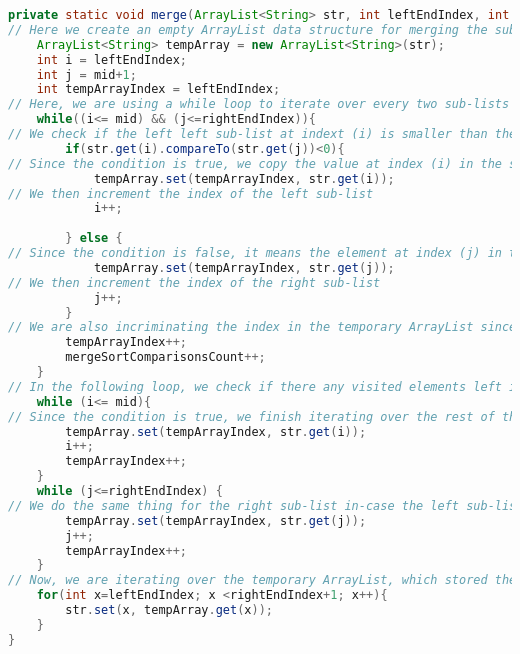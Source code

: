 \documentclass{article}
\begin{document}
\begin{lstlisting}[language=Java]
private static void merge(ArrayList<String> str, int leftEndIndex, int mid, int rightEndIndex) {
// Here we create an empty ArrayList data structure for merging the sub-lists since we can't use our original list to merge the sub-lists because there are more than two sub-lists. We then copy the elements of the original list into the new temporary list because we can't access the indices of an empty list.  
    ArrayList<String> tempArray = new ArrayList<String>(str);
    int i = leftEndIndex;
    int j = mid+1;
    int tempArrayIndex = leftEndIndex;
// Here, we are using a while loop to iterate over every two sub-lists by comparing the their values to each other and placing each value in the sub-list onto the temporary ArrayList we have created for storing sub-lists. 
    while((i<= mid) && (j<=rightEndIndex)){
// We check if the left left sub-list at indext (i) is smaller than the one in the right.
        if(str.get(i).compareTo(str.get(j))<0){
// Since the condition is true, we copy the value at index (i) in the sub-list into the temporary ArrayList of strings. 
            tempArray.set(tempArrayIndex, str.get(i));
// We then increment the index of the left sub-list 
            i++;
            
        } else {
// Since the condition is false, it means the element at index (j) in the right sub-list is smaller and that element will be stored in the temporary ArrayList at index (j)
            tempArray.set(tempArrayIndex, str.get(j));
// We then increment the index of the right sub-list 
            j++;
        }
// We are also incriminating the index in the temporary ArrayList since we place an element at the current index 
        tempArrayIndex++;
        mergeSortComparisonsCount++;
    }
// In the following loop, we check if there any visited elements left in the left sub-list in case the right sub-list traversal finished before the left-sub-list.  
    while (i<= mid){
// Since the condition is true, we finish iterating over the rest of the elements int he left sub-list and just put them in the temproray list since there are no element to compare with fromt he right sub-list. 
        tempArray.set(tempArrayIndex, str.get(i));
        i++;
        tempArrayIndex++;
    }
    while (j<=rightEndIndex) {
// We do the same thing for the right sub-list in-case the left sub-list are visited before the right sub-list iteration is finished and just put them in the temporary list. 
        tempArray.set(tempArrayIndex, str.get(j));
        j++;
        tempArrayIndex++;
    }
// Now, we are iterating over the temporary ArrayList, which stored the sorted list and copy element back into their original ArrayList. 
    for(int x=leftEndIndex; x <rightEndIndex+1; x++){
        str.set(x, tempArray.get(x));
    }
}
\end{lstlisting}
\end{document}
